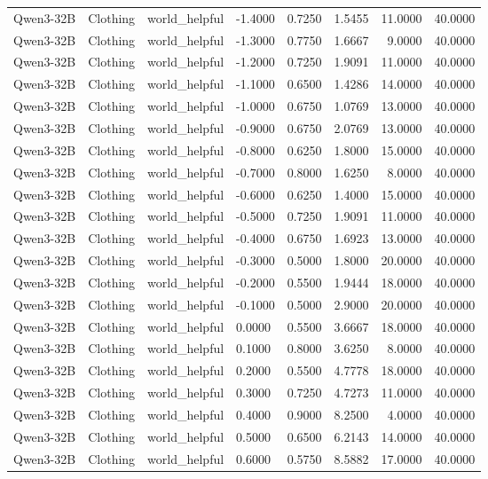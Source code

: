 \begin{table}
\begin{tabular}{llllrrrr}
Qwen3-32B & Clothing & world_helpful & -1.4000 & 0.7250 & 1.5455 & 11.0000 & 40.0000 \\
Qwen3-32B & Clothing & world_helpful & -1.3000 & 0.7750 & 1.6667 & 9.0000 & 40.0000 \\
Qwen3-32B & Clothing & world_helpful & -1.2000 & 0.7250 & 1.9091 & 11.0000 & 40.0000 \\
Qwen3-32B & Clothing & world_helpful & -1.1000 & 0.6500 & 1.4286 & 14.0000 & 40.0000 \\
Qwen3-32B & Clothing & world_helpful & -1.0000 & 0.6750 & 1.0769 & 13.0000 & 40.0000 \\
Qwen3-32B & Clothing & world_helpful & -0.9000 & 0.6750 & 2.0769 & 13.0000 & 40.0000 \\
Qwen3-32B & Clothing & world_helpful & -0.8000 & 0.6250 & 1.8000 & 15.0000 & 40.0000 \\
Qwen3-32B & Clothing & world_helpful & -0.7000 & 0.8000 & 1.6250 & 8.0000 & 40.0000 \\
Qwen3-32B & Clothing & world_helpful & -0.6000 & 0.6250 & 1.4000 & 15.0000 & 40.0000 \\
Qwen3-32B & Clothing & world_helpful & -0.5000 & 0.7250 & 1.9091 & 11.0000 & 40.0000 \\
Qwen3-32B & Clothing & world_helpful & -0.4000 & 0.6750 & 1.6923 & 13.0000 & 40.0000 \\
Qwen3-32B & Clothing & world_helpful & -0.3000 & 0.5000 & 1.8000 & 20.0000 & 40.0000 \\
Qwen3-32B & Clothing & world_helpful & -0.2000 & 0.5500 & 1.9444 & 18.0000 & 40.0000 \\
Qwen3-32B & Clothing & world_helpful & -0.1000 & 0.5000 & 2.9000 & 20.0000 & 40.0000 \\
Qwen3-32B & Clothing & world_helpful & 0.0000 & 0.5500 & 3.6667 & 18.0000 & 40.0000 \\
Qwen3-32B & Clothing & world_helpful & 0.1000 & 0.8000 & 3.6250 & 8.0000 & 40.0000 \\
Qwen3-32B & Clothing & world_helpful & 0.2000 & 0.5500 & 4.7778 & 18.0000 & 40.0000 \\
Qwen3-32B & Clothing & world_helpful & 0.3000 & 0.7250 & 4.7273 & 11.0000 & 40.0000 \\
Qwen3-32B & Clothing & world_helpful & 0.4000 & 0.9000 & 8.2500 & 4.0000 & 40.0000 \\
Qwen3-32B & Clothing & world_helpful & 0.5000 & 0.6500 & 6.2143 & 14.0000 & 40.0000 \\
Qwen3-32B & Clothing & world_helpful & 0.6000 & 0.5750 & 8.5882 & 17.0000 & 40.0000 \\

\end{tabular}
\end{table}
